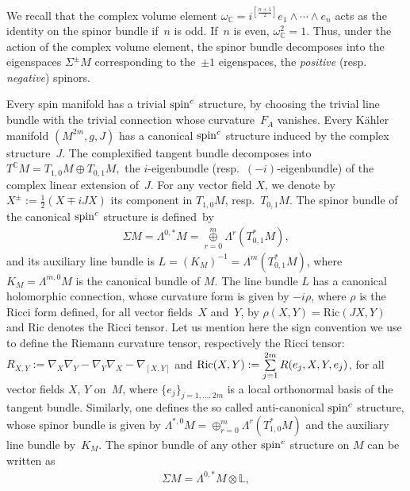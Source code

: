 \documentclass[pdftex]{sigma}
\numberwithin{equation}{section}
\theoremstyle{definition}
\begin{document}
We recall that the complex volume element $\omega_{\mathbb{C}}=i^{[\frac{n+1}{2}]} e_1\wedge \cdots \wedge e_n$ acts as the identity on the spinor bundle if~$n$ is odd. If~$n$ is even,  $\omega_{\mathbb C}^2=1$. Thus, under the action of the complex volume element, the spinor bundle  decomposes into the  eigenspaces $\Sigma^{\pm} M$ corresponding to the~$\pm 1$ eigenspaces, the {\it positive} (resp. {\it negative}) spinors.

Every spin manifold has a trivial ${\mathop{\rm spin}^c}$ structure, by
choosing the trivial line bundle with the trivial connection whose curvature~$F_A$
vanishes.  Every K\"ahler manifold $(M^{2m},g,J)$ has a canonical
${\mathop{\rm spin}^c}$ structure induced by the complex structure~$J$.
The complexif\/ied tangent bundle decomposes into
$T^{\mathbb{C}} M = T_{1,0} M\oplus T_{0,1} M,$
 the $i$-eigenbundle (resp.~$(-i)$-eigenbundle) of the complex linear extension of~$J$.
For any vector f\/ield $X$, we denote by $X^{\pm}:=\frac{1}{2}(X\mp iJX)$ its component in $T_{1,0} M$, resp.~$T_{0,1} M$.
The spinor bundle of the canonical ${\mathop{\rm spin}^c}$ structure is def\/ined~by
\begin{gather*}
\Sigma M = \Lambda^{0,*} M =\overset{m}{\underset{r=0}{\oplus}} \Lambda^r (T_{0,1}^* M),
\end{gather*}
and its auxiliary line bundle is  $L = (K_M)^{-1}= \Lambda^m (T_{0,1}^* M)$, where $K_M=\Lambda^{m,0}M$ is the canonical bundle of $M$.
The line bundle $L$ has a canonical holomorphic connection, whose curvature form is given by $- i\rho$,
where $\rho$ is the Ricci form def\/ined, for all vector f\/ields~$X$ and~$Y$, by $\rho(X, Y) = \mathrm{Ric}(JX, Y)$ and $\mathrm{Ric}$ denotes the Ricci tensor. Let us mention here the sign convention we use to def\/ine the Riemann curvature tensor, respectively the Ricci tensor: $R_{X,Y}:=\nabla_{X}\nabla_{Y}
-\nabla_{Y}\nabla_{X}-\nabla_{[X,Y]}$ and ${\mathop{\rm Ric}}(X,Y):=\sum\limits_{j=1}^{2m}R(e_j,X,Y,e_j)$, for all vector f\/ields $X$, $Y$ on~$M$, where $\{e_j\}_{j=1,\dots, 2m}$ is a local orthonormal basis of the tangent bundle.
Similarly, one def\/ines  the so called anti-canonical ${\mathop{\rm spin}^c}$ structure, whose spinor bundle is given by
$\Lambda^{*, 0} M =\oplus_{r=0}^m \Lambda^r (T_{1, 0}^* M)$ and the auxiliary line bundle by~$K_M$. The spinor bundle of any other ${\mathop{\rm spin}^c}$ structure on $M$ can be written as
\begin{gather*}
\Sigma M =  \Lambda^{0, *} M \otimes \mathbb L,
\end{gather*}
\end{document}
